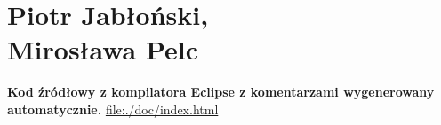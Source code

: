 \chapter{Piotr Jabłoński,\\ Mirosława Pelc}



\textbf{Kod źródłowy z kompilatora Eclipse z komentarzami wygenerowany automatycznie.}
\url{file:./doc/index.html}
